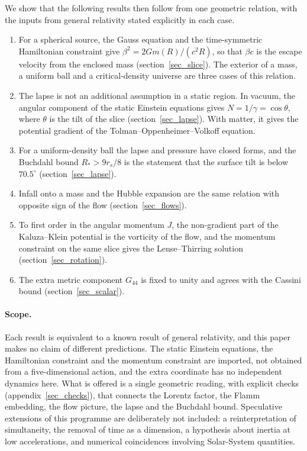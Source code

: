 \documentclass[pdflatex,sn-mathphys-num]{sn-jnl}%
\theoremstyle{thmstyleone}%
\theoremstyle{thmstyletwo}%
\theoremstyle{thmstylethree}%
\begin{document}
We show that the following results then follow from one geometric relation, with the inputs from general relativity stated explicitly in each case.
\begin{enumerate}
\item For a spherical source, the Gauss equation and the time-symmetric Hamiltonian constraint give $\beta^2=2Gm(R)/(c^2R)$, so that $\beta c$ is the escape velocity from the enclosed mass (section~\ref{sec_slice}). The exterior of a mass, a uniform ball and a critical-density universe are three cases of this relation.
\item The lapse is not an additional assumption in a static region. In vacuum, the angular component of the static Einstein equations gives $N=1/\gamma=\cos\theta$, where $\theta$ is the tilt of the slice (section~\ref{sec_lapse}). With matter, it gives the potential gradient of the Tolman--Oppenheimer--Volkoff equation.
\item For a uniform-density ball the lapse and pressure have closed forms, and the Buchdahl bound $R_*>9r_s/8$ is the statement that the surface tilt is below $70.5^\circ$ (section~\ref{sec_lapse}).
\item Infall onto a mass and the Hubble expansion are the same relation with opposite sign of the flow (section~\ref{sec_flows}).
\item To first order in the angular momentum $J$, the non-gradient part of the Kaluza--Klein potential is the vorticity of the flow, and the momentum constraint on the same slice gives the Lense--Thirring solution (section~\ref{sec_rotation}).
\item The extra metric component $G_{44}$ is fixed to unity and agrees with the Cassini bound (section~\ref{sec_scalar}).
\end{enumerate}

\paragraph{Scope.} Each result is equivalent to a known result of general relativity, and this paper makes no claim of different predictions. The static Einstein equations, the Hamiltonian constraint and the momentum constraint are imported, not obtained from a five-dimensional action, and the extra coordinate has no independent dynamics here. What is offered is a single geometric reading, with explicit checks (appendix~\ref{sec_checks}), that connects the Lorentz factor, the Flamm embedding, the flow picture, the lapse and the Buchdahl bound. Speculative extensions of this programme are deliberately not included: a reinterpretation of simultaneity, the removal of time as a dimension, a hypothesis about inertia at low accelerations, and numerical coincidences involving Solar-System quantities.
\end{document}
